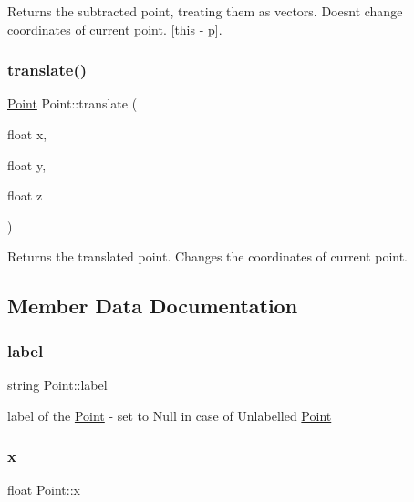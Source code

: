Returns the subtracted point, treating them as vectors. Doesn\textquotesingle{}t change coordinates of current point. \mbox{[}this -\/ p\mbox{]}. 

\mbox{\label{class_point_acf38257ee8ba425115bab283b777ad17}} 
\subsubsection{\texorpdfstring{translate()}{translate()}}
{\footnotesize\ttfamily \mbox{\hyperlink{class_point}{Point}} Point\+::translate (\begin{DoxyParamCaption}\item[{float}]{x,  }\item[{float}]{y,  }\item[{float}]{z }\end{DoxyParamCaption})}



Returns the translated point. Changes the coordinates of current point. 



\subsection{Member Data Documentation}
\mbox{\label{class_point_a1e929419353f9bec46732af977adb55a}} 
\subsubsection{\texorpdfstring{label}{label}}
{\footnotesize\ttfamily string Point\+::label}



label of the \mbox{\hyperlink{class_point}{Point}} -\/ set to Null in case of Unlabelled \mbox{\hyperlink{class_point}{Point}} 

\mbox{\label{class_point_a05dfe2dfbde813ad234b514f30e662f1}} 
\subsubsection{\texorpdfstring{x}{x}}
{\footnotesize\ttfamily float Point\+::x}



